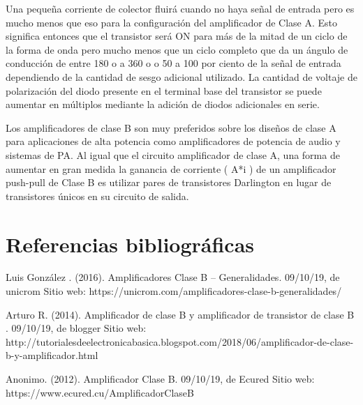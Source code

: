 \documentclass[12pt,a4paper]{article}
\begin{document}
\begin{flushleft}
\begin{flushleft}
Una pequeña corriente de colector fluirá cuando no haya señal de entrada pero es mucho menos que eso para la configuración del amplificador de Clase A. Esto significa entonces que el transistor será ON para más de la mitad de un ciclo de la forma de onda pero mucho menos que un ciclo completo que da un ángulo de conducción de entre 180 o a 360 o o 50 a 100 por ciento de la señal de entrada dependiendo de la cantidad de sesgo adicional utilizado. La cantidad de voltaje de polarización del diodo presente en el terminal base del transistor se puede aumentar en múltiplos mediante la adición de diodos adicionales en serie.\linebreak

Los amplificadores de clase B son muy preferidos sobre los diseños de clase A para aplicaciones de alta potencia como amplificadores de potencia de audio y sistemas de PA. Al igual que el circuito amplificador de clase A, una forma de aumentar en gran medida la ganancia de corriente ( A*i ) de un amplificador push-pull de Clase B es utilizar pares de transistores Darlington en lugar de transistores únicos en su circuito de salida.\linebreak

\section{Referencias bibliográficas}
\begin{flushleft}
Luis González . (2016). Amplificadores Clase B – Generalidades. 09/10/19, de unicrom Sitio web: https://unicrom.com/amplificadores-clase-b-generalidades/ \linebreak


Arturo R. (2014). Amplificador de clase B y amplificador de transistor de clase B . 09/10/19, de blogger Sitio web: http://tutorialesdeelectronicabasica.blogspot.com/2018/06/amplificador-de-clase-b-y-amplificador.html \linebreak

Anonimo. (2012). Amplificador Clase B. 09/10/19, de Ecured Sitio web: https://www.ecured.cu/AmplificadorClaseB

\end{flushleft}
\end{flushleft}
\end{flushleft}
\end{document}
